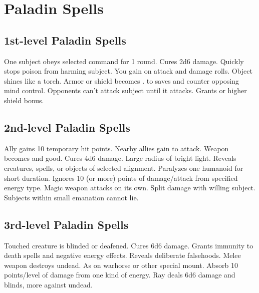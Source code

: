 \section{Paladin Spells}  

\subsection{1st-level Paladin Spells}
\begin{spelllist}
   One subject obeys selected command for 1 round.
   Cures 2d6 damage.
   Quickly stops poison from harming subject.
   You gain  on attack and damage rolls.
   Object shines like a torch.
   Armor or shield becomes .
    to saves and counter opposing mind control.
   Opponents can't attack subject until it attacks.
   Grants  or higher shield bonus.
\end{spelllist}

\subsection{2nd-level Paladin Spells}
\begin{spelllist}
   Ally gains 10 temporary hit points.
   Nearby allies gain  to attack.
   Weapon becomes  and good.
   Cures 4d6 damage.
   Large radius of bright light.
   Reveals creatures, spells, or objects of selected alignment.
   Paralyzes one humanoid for short duration.
   Ignores 10 (or more) points of damage/attack from specified energy type.
   Magic weapon attacks on its own.
   Split damage with willing subject.
   Subjects within small emanation cannot lie.
\end{spelllist}

\subsection{3rd-level Paladin Spells}
\begin{spelllist} 
   Touched creature is blinded or deafened.
   Cures 6d6 damage.
   Grants immunity to death spells and negative energy effects.
   Reveals deliberate falsehoods.
   Melee weapon destroys undead.
   As  on warhorse or other special mount.
   Absorb 10 points/level of damage from one kind of energy.
   Ray deals 6d6 damage and blinds, more against undead.
\end{spelllist}


